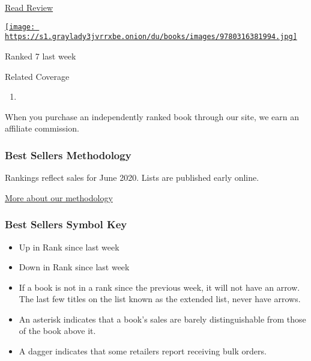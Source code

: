 \begin{enumerate}
  \href{https://www.nytimes3xbfgragh.onion/2016/04/10/books/review/the-wild-robot-by-peter-brown.html}{Read
  Review}

  \href{https://www.nytimes3xbfgragh.onion/2016/04/10/books/review/the-wild-robot-by-peter-brown.html}{\texttt{[image: https://s1.graylady3jvrrxbe.onion/du/books/images/9780316381994.jpg]}}

  Ranked 7 last week
\end{enumerate}

Related Coverage

\begin{enumerate}
\def\labelenumi{\arabic{enumi}.}
\tightlist
\item
  \href{https://www.nytimes3xbfgragh.onion/2020/07/31/books/review/the-system-robert-reich-break-em-up-zephyr-teachout.html}{}
\end{enumerate}

When you purchase an independently ranked book through our site, we earn
an affiliate commission.

\hypertarget{best-sellers-methodology}{%
\subsubsection{Best Sellers
Methodology}\label{best-sellers-methodology}}

Rankings reflect sales for June 2020. Lists are published early online.

\href{/books/best-sellers/methodology/}{More about our methodology}

\hypertarget{best-sellers-symbol-key}{%
\subsubsection{Best Sellers Symbol Key}\label{best-sellers-symbol-key}}

\begin{itemize}
\item
  Up in Rank since last week
\item
  Down in Rank since last week
\item
  If a book is not in a rank since the previous week, it will not have
  an arrow. The last few titles on the list known as the extended list,
  never have arrows.
\item
  An asterisk indicates that a book's sales are barely distinguishable
  from those of the book above it.
\item
  A dagger indicates that some retailers report receiving bulk orders.
\end{itemize}

